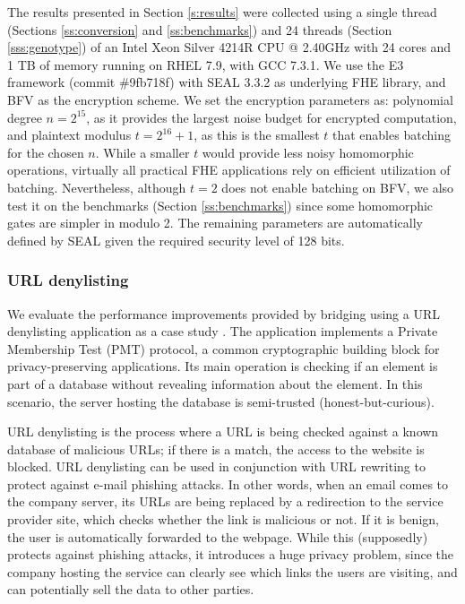 The results presented in Section \ref{s:results} were collected using a single thread (Sections \ref{ss:conversion} and \ref{ss:benchmarks}) and 24 threads (Section \ref{sss:genotype}) of an Intel Xeon Silver 4214R CPU @ 2.40GHz with 24 cores and 1 TB of memory running on RHEL 7.9, with GCC 7.3.1. We use the E3 framework (commit \#9fb718f) with SEAL 3.3.2 \cite{seal} as underlying FHE library, and BFV as the encryption scheme. We set the encryption parameters as: polynomial degree $n = 2^{15}$, as it provides the largest noise budget for encrypted computation, and plaintext modulus $t = 2^{16}+1$, as this is the smallest $t$ that enables batching for the chosen $n$. While a smaller $t$ would provide less noisy homomorphic operations, virtually all practical FHE applications rely on efficient utilization of batching. Nevertheless, although $t=2$ does not enable batching on BFV, we also test it on the benchmarks (Section \ref{ss:benchmarks}) since some homomorphic gates are simpler in modulo 2. The remaining parameters are automatically defined by SEAL given the required security level of 128 bits.
\subsubsection{URL denylisting}
\label{ss:url}


We evaluate the performance improvements provided by bridging using a URL denylisting application as a case study \cite{urldenylist}.
The application implements a Private Membership Test (PMT) protocol, a common cryptographic building block for privacy-preserving applications.
Its main operation is checking if an element is part of a database without revealing information about the element.
In this scenario, the server hosting the database is semi-trusted (honest-but-curious).

URL denylisting is the process where a URL is being checked against a known database of malicious URLs; if there is a match, the access to the website is blocked. URL denylisting can be used in conjunction with URL rewriting to protect against e-mail phishing attacks. In other words, when an email comes to the company server, its URLs are being replaced by a redirection to the service provider site, which checks whether the link is malicious or not. If it is benign, the user is automatically forwarded to the webpage. While this (supposedly) protects against phishing attacks, it introduces a huge privacy problem, since the company hosting the service can clearly see which links the users are visiting, and can potentially sell the data to other parties. 

